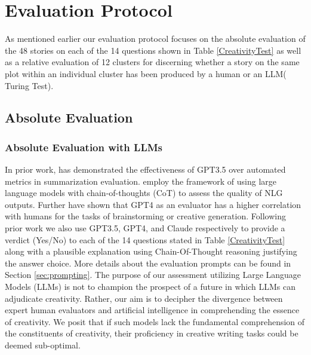 \section{Evaluation Protocol}
As mentioned earlier our evaluation protocol focuses on the absolute evaluation of the 48 stories on each of the 14 questions shown in Table \ref{CreativityTest} as well as a relative evaluation of 12 clusters for discerning whether a story on the same plot within an individual cluster has been produced by a human or an LLM( Turing Test).
\subsection{Absolute Evaluation}
\subsubsection{Absolute Evaluation with LLMs}
In prior work, \cite{gao2023human} has demonstrated the effectiveness of GPT3.5 over automated metrics in summarization evaluation.\cite{liu2023gpteval} employ the framework of using large language models with chain-of-thoughts (CoT) \cite{wei2022chain} to assess the quality of NLG outputs. Further \cite{rajani2023llm_labels} have shown that GPT4 as an evaluator has a higher correlation with humans for the tasks of brainstorming or creative generation. Following prior work we also use GPT3.5, GPT4, and Claude respectively to provide a verdict (Yes/No) to each of the 14 questions stated in Table \ref{CreativityTest} along with a plausible explanation using Chain-Of-Thought reasoning justifying the answer choice. More details about the evaluation prompts can be found in Section \ref{sec:prompting}. The purpose of our assessment utilizing Large Language Models (LLMs) is not to champion the prospect of a future in which LLMs can adjudicate creativity. Rather, our aim is to decipher the divergence between expert human evaluators and artificial intelligence in comprehending the essence of creativity. We posit that if such models lack the fundamental comprehension of the constituents of creativity, their proficiency in creative writing tasks could be deemed sub-optimal.
